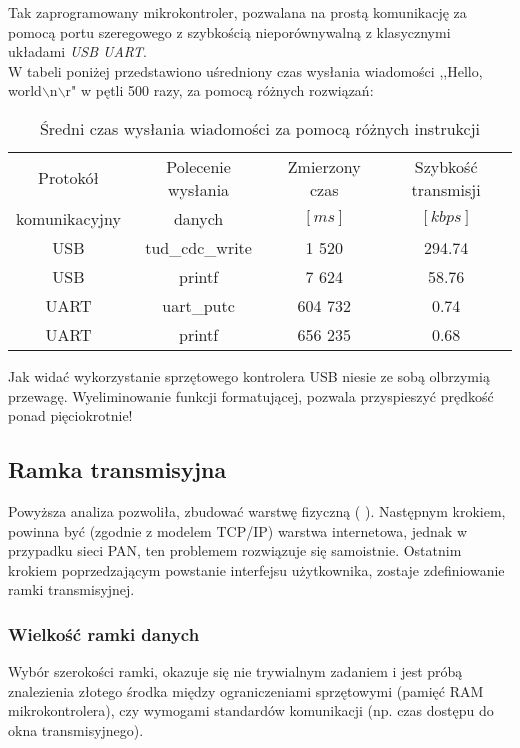     Tak zaprogramowany mikrokontroler, pozwalana na prostą komunikację za pomocą portu szeregowego z szybkością nieporównywalną z klasycznymi układami \textit{USB UART}.\\
    W tabeli poniżej przedstawiono uśredniony czas wysłania wiadomości ,,Hello, world$\backslash$n$\backslash$r" w pętli 500 razy, za pomocą różnych rozwiązań:
    \begin{table}[!ht]
        \centering
        \caption{Średni czas wysłania wiadomości za pomocą różnych instrukcji}
        \begin{tabular}{|c|c|c|c|}\hline
            Protokół      & Polecenie wysłania & Zmierzony czas & Szybkość transmisji\\
            komunikacyjny & danych & $[ms]$& $[kbps]$\\\hline
            USB & tud\_cdc\_write &   1 520 & 294.74  \\\hline
            USB & printf          &   7 624 &  58.76  \\\hline
            UART& uart\_putc      & 604 732 &   0.74 \\\hline
            UART& printf          & 656 235 &   0.68 \\\hline
        \end{tabular}
    \end{table}

    Jak widać wykorzystanie sprzętowego kontrolera USB niesie ze sobą olbrzymią przewagę.
    Wyeliminowanie funkcji formatującej, pozwala przyspieszyć prędkość ponad pięciokrotnie!


\newpage
\subsection{Ramka transmisyjna}
    Powyższa analiza pozwoliła, zbudować warstwę fizyczną ( \cite{Model_TCP_IP}).
    Następnym krokiem, powinna być (zgodnie z modelem TCP/IP) warstwa internetowa, jednak w przypadku sieci PAN, ten problemem rozwiązuje się samoistnie.
    Ostatnim krokiem poprzedzającym powstanie interfejsu użytkownika, zostaje zdefiniowanie ramki transmisyjnej.

    \subsubsection{Wielkość ramki danych}
        Wybór szerokości ramki, okazuje się nie trywialnym zadaniem i jest próbą znalezienia złotego środka między ograniczeniami sprzętowymi (pamięć RAM mikrokontrolera),
        czy wymogami standardów komunikacji (np. czas dostępu do okna transmisyjnego).

